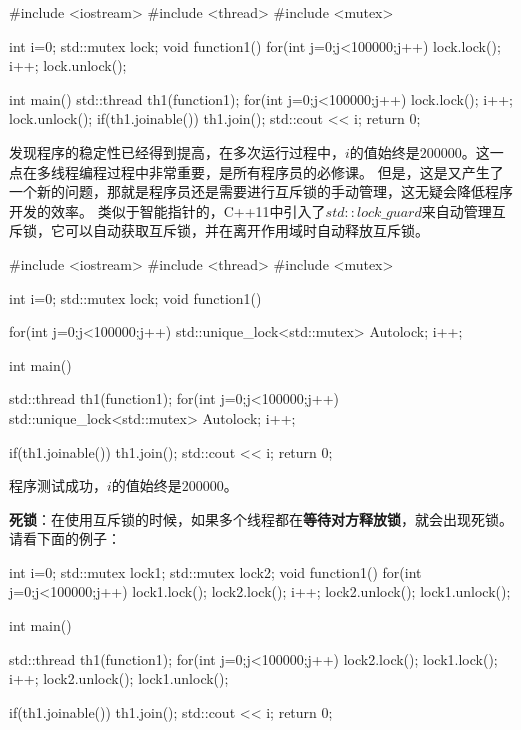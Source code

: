 \begin{tcode}
#include <iostream>
#include <thread>
#include <mutex>

int i=0;
std::mutex lock;
void function1(){
    for(int j=0;j<100000;j++){
        lock.lock();
        i++;
        lock.unlock();
    }
}

int main() {
    std::thread th1(function1);
    for(int j=0;j<100000;j++){
        lock.lock();
        i++;
        lock.unlock();
    }
    if(th1.joinable())
        th1.join();
    std::cout << i;
    return 0;
}
\end{tcode}
发现程序的稳定性已经得到提高，在多次运行过程中，$i$的值始终是$200000$。这一点在多线程编程过程中非常重要，是所有程序员的必修课。
但是，这是又产生了一个新的问题，那就是程序员还是需要进行互斥锁的手动管理，这无疑会降低程序开发的效率。
类似于智能指针的，C++11中引入了$std::lock\_guard$来自动管理互斥锁，它可以自动获取互斥锁，并在离开作用域时自动释放互斥锁。

\begin{tcode}
#include <iostream>
#include <thread>
#include <mutex>

int i=0;
std::mutex lock;
void function1(){
    for(int j=0;j<100000;j++){
        std::unique_lock<std::mutex> Autolock;
        i++;
    }

}

int main() {
    std::thread th1(function1);
    for(int j=0;j<100000;j++){
        std::unique_lock<std::mutex> Autolock;
        i++;
    }

    if(th1.joinable())
        th1.join();
    std::cout << i;
    return 0;
}
\end{tcode}
程序测试成功，$i$的值始终是$200000$。

\textbf{死锁}：在使用互斥锁的时候，如果多个线程都在\textbf{等待对方释放锁}，就会出现死锁。请看下面的例子：

\begin{tcode}
int i=0;
std::mutex lock1;
std::mutex lock2;
void function1(){
    for(int j=0;j<100000;j++){
        lock1.lock();
        lock2.lock();
        i++;
        lock2.unlock();
        lock1.unlock();
    }
}

int main() {
    std::thread th1(function1);
    for(int j=0;j<100000;j++){
        lock2.lock();
        lock1.lock();
        i++;
        lock2.unlock();
        lock1.unlock();
    }

    if(th1.joinable())
        th1.join();
    std::cout << i;
    return 0;
}

\end{tcode}

